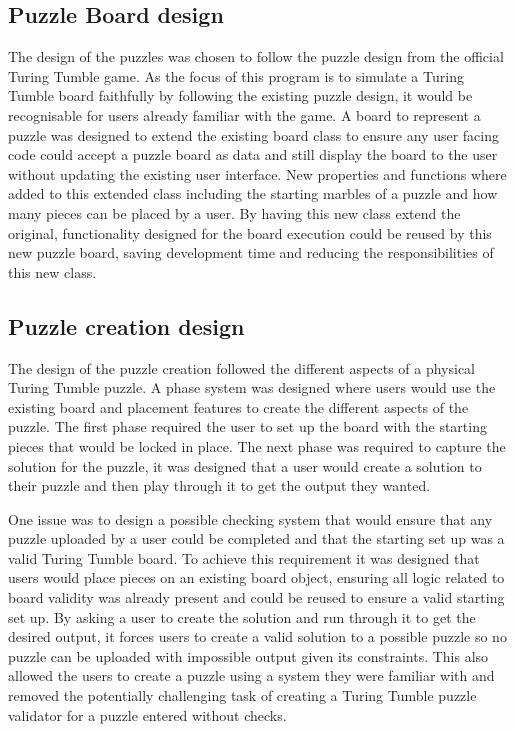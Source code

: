 \documentclass{l4proj}
\begin{document}
\subsection{Puzzle Board design}
The design of the puzzles was chosen to follow the puzzle design from the official Turing Tumble game. As the focus of this program is to simulate a Turing Tumble board faithfully by following the existing puzzle design, it would be recognisable for users already familiar with the game. A board to represent a puzzle was designed to extend the existing board class to ensure any user facing code could accept a puzzle board as data and still display the board to the user without updating the existing user interface. New properties and functions where added to this extended class including the starting marbles of a puzzle and how many pieces can be placed by a user. By having this new class extend the original, functionality designed for the board execution could be reused by this new puzzle board, saving development time and reducing the responsibilities of this new class. 

\subsection{Puzzle creation design}
The design of the puzzle creation followed the different aspects of a physical Turing Tumble puzzle. A phase system was designed where users would use the existing board and placement features to create the different aspects of the puzzle. The first phase required the user to set up the board with the starting pieces that would be locked in place. The next phase was required to capture the solution for the puzzle, it was designed that a user would create a solution to their puzzle and then play through it to get the output they wanted. 

One issue was to design a possible checking system that would ensure that any puzzle uploaded by a user could be completed and that the starting set up was a valid Turing Tumble board. To achieve this requirement it was designed that users would place pieces on an existing board object, ensuring all logic related to board validity was already present and could be reused to ensure a valid starting set up. By asking a user to create the solution and run through it to get the desired output, it forces users to create a valid solution to a possible puzzle so no puzzle can be uploaded with impossible output given its constraints. This also allowed the users to create a puzzle using a system they were familiar with and removed the potentially challenging task of creating a Turing Tumble puzzle validator for a puzzle entered without checks. 
\end{document}
